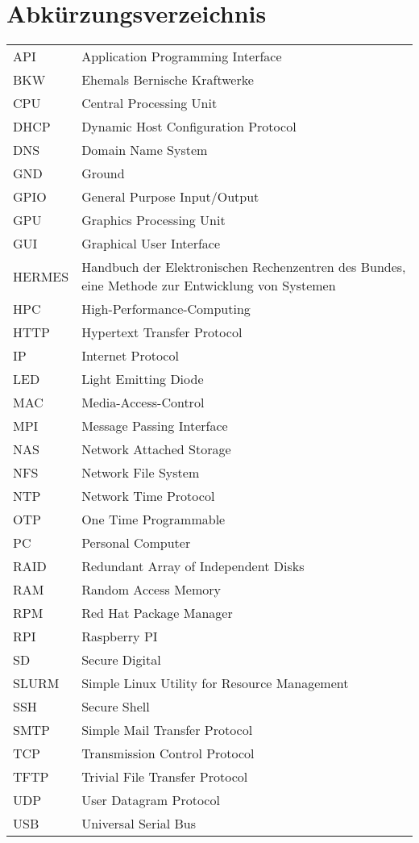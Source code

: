 \section*{Abkürzungsverzeichnis}

\begin{table}[H]
\centering
\label{my-label}
\begin{tabular}{p{2cm}p{14cm}}
API & Application Programming Interface \\
BKW & Ehemals Bernische Kraftwerke \\
CPU & Central Processing Unit \\
DHCP & Dynamic Host Configuration Protocol \\
DNS & Domain Name System \\
GND & Ground \\
GPIO & General Purpose Input/Output \\
GPU & Graphics Processing Unit \\
GUI & Graphical User Interface \\
HERMES & Handbuch der Elektronischen Rechenzentren des Bundes, eine Methode zur Entwicklung von Systemen \\
HPC & High-Performance-Computing \\
HTTP & Hypertext Transfer Protocol \\
IP & Internet Protocol \\
LED & Light Emitting Diode \\
MAC & Media-Access-Control \\
MPI & Message Passing Interface \\
NAS & Network Attached Storage  \\
NFS & Network File System \\
NTP & Network Time Protocol \\
OTP & One Time Programmable \\
PC & Personal Computer \\
RAID & Redundant Array of Independent Disks \\
RAM & Random Access Memory \\
RPM & Red Hat Package Manager \\
RPI & Raspberry PI \\
SD & Secure Digital \\
SLURM & Simple Linux Utility for Resource Management \\
SSH & Secure Shell  \\
SMTP & Simple Mail Transfer Protocol \\
TCP & Transmission Control Protocol \\
TFTP & Trivial File Transfer Protocol \\
UDP & User Datagram Protocol \\
USB & Universal Serial Bus \\
\end{tabular}
\end{table}
